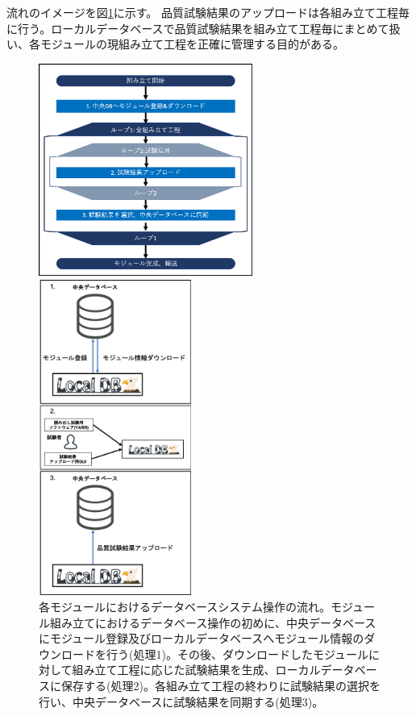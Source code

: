 流れのイメージを図\ref{dbsystem_flow}に示す。
品質試験結果のアップロードは各組み立て工程毎に行う。ローカルデータベースで品質試験結果を組み立て工程毎にまとめて扱い、各モジュールの現組み立て工程を正確に管理する目的がある。
\begin{figure}[bpt]\centering
  \begin{minipage}{0.5\hsize}
    \includegraphics[width=7cm]{./dbsystem_flowchart.png}
  \end{minipage}
  \begin{minipage}{0.4\hsize}
    \includegraphics[width=5cm]{./dbsystem_flow_image.png}
  \end{minipage}
\caption[各モジュールにおけるデータベースシステム操作の流れ]{各モジュールにおけるデータベースシステム操作の流れ。モジュール組み立てにおけるデータベース操作の初めに、中央データベースにモジュール登録及びローカルデータベースへモジュール情報のダウンロードを行う(処理1)。その後、ダウンロードしたモジュールに対して組み立て工程に応じた試験結果を生成、ローカルデータベースに保存する(処理2)。各組み立て工程の終わりに試験結果の選択を行い、中央データベースに試験結果を同期する(処理3)。}
\label{dbsystem_flow}
\end{figure}

